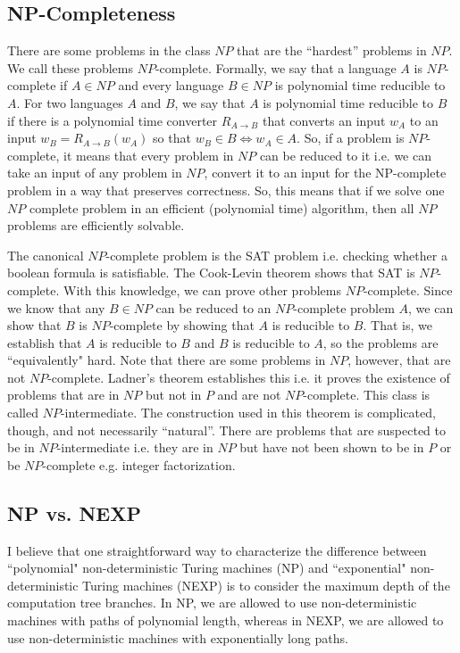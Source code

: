 \documentclass[10pt,a4paper]{article}
\begin{document}
\subsection{NP-Completeness}

There are some problems in the class $NP$ that are the ``hardest'' problems in $NP$. We call these problems $NP$-complete. Formally, we say that a language $A$ is $NP$-complete if $A \in NP$ and every language $B \in NP$ is polynomial time reducible to $A$. For two languages $A$ and $B$, we say that $A$ is polynomial time reducible to $B$ if there is a polynomial time converter $R_{A\rightarrow B}$ that converts an input $w_A$ to an input $w_B = R_{A\rightarrow B}(w_A)$ so that $w_B \in B \iff w_A \in A$. So, if a problem is $NP$-complete, it means that every problem in $NP$ can be reduced to it i.e. we can take an input of any problem in $NP$, convert it to an input for the NP-complete problem in a way that preserves correctness. So, this means that if we solve one $NP$ complete problem in an efficient (polynomial time) algorithm, then all $NP$ problems are efficiently solvable. 

The canonical $NP$-complete problem is the SAT problem i.e. checking whether a boolean formula is satisfiable. The Cook-Levin theorem shows that SAT is $NP$-complete. With this knowledge, we can prove other problems $NP$-complete. Since we know that any $B \in NP$ can be reduced to an $NP$-complete problem $A$, we can show that $B$ is $NP$-complete by showing that $A$ is reducible to $B$. That is, we establish that $A$ is reducible to $B$ and $B$ is reducible to $A$, so the problems are ``equivalently" hard. Note that there are some problems in $NP$, however, that are not $NP$-complete. Ladner's theorem establishes this i.e. it proves the existence of problems that are in $NP$ but not in $P$ and are not $NP$-complete. This class is called $NP$-intermediate. The construction used in this theorem is complicated, though, and not necessarily ``natural''. There are problems that are suspected to be in $NP$-intermediate i.e. they are in $NP$ but have not been shown to be in $P$ or be $NP$-complete e.g. integer factorization.

\subsection{NP vs. NEXP}

I believe that one straightforward way to characterize the difference between ``polynomial" non-deterministic Turing machines (NP) and ``exponential" non-deterministic Turing machines (NEXP) is to consider the maximum depth of the computation tree branches. In NP, we are allowed to use non-deterministic machines with paths of polynomial length, whereas in NEXP, we are allowed to use non-deterministic machines with exponentially long paths.
\end{document}
